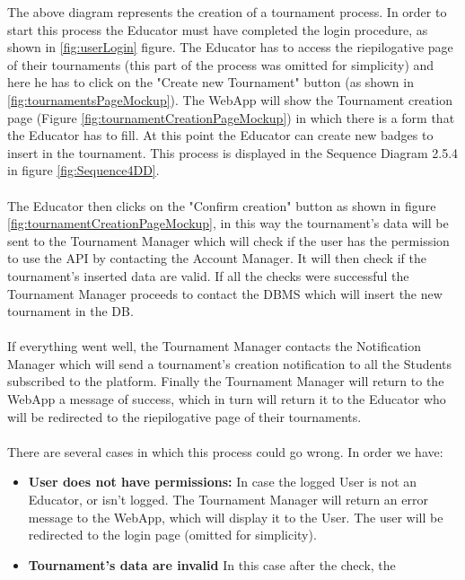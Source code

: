 \documentclass{article}
\begin{document}
{        The above diagram represents the creation of a tournament process.
        In order to start this process the Educator must have completed the login procedure, as shown in \ref{fig:userLogin} figure.
        The Educator has to access the riepilogative page of their tournaments 
        (this part of the process was omitted for simplicity) and here he has to click 
        on the "Create new Tournament" button (as shown in \ref{fig:tournamentsPageMockup}).
        The WebApp will show the Tournament creation page (Figure \ref{fig:tournamentCreationPageMockup})
        in which there is a form that the Educator has to fill.
        At this point the Educator can create new badges to insert in the tournament. This
        process is displayed in the Sequence Diagram 2.5.4 in figure \ref{fig:Sequence4DD}.
        \\ \\
        The Educator then clicks on the "Confirm creation" button as shown in figure 
        \ref{fig:tournamentCreationPageMockup}, in this way the tournament's data will be sent to the
        Tournament Manager which will check if the user has the permission to use the API
        by contacting the Account Manager. It will then check if the tournament's inserted data
        are valid. If all the checks were successful the Tournament Manager proceeds to
        contact the DBMS which will insert the new tournament in the DB.
        \\ \\
        If everything went well, the Tournament Manager contacts the Notification
        Manager which will send a tournament's creation notification to all the Students
        subscribed to the platform. 
        Finally the Tournament Manager will return to the WebApp a message of success,
        which in turn will return it to the Educator who will be redirected to the 
        riepilogative page of their tournaments.
        \\ \\
        There are several cases in which this process could go wrong. In order we have:
        \begin{itemize}
            \item \textbf{User does not have permissions:} In case the logged User is not an
            Educator, or isn't logged. The Tournament Manager will return an
            error message to the WebApp, which will display it to the User.
            The user will be redirected to the login page (omitted for simplicity).
            \item \textbf{Tournament's data are invalid} In this case after the check, the 

\end{itemize}}
\end{document}
